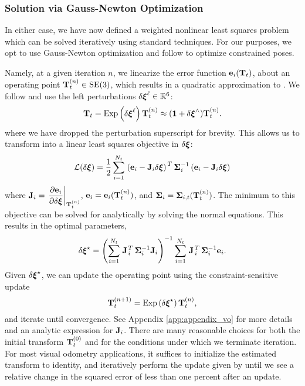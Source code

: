 \subsubsection{Solution via Gauss-Newton Optimization}
\label{sec:vo_gauss_newton}
 In either case, we have now defined a weighted nonlinear least squares problem which can be solved iteratively using
standard techniques. For our purposes, we opt to use Gauss-Newton optimization and follow \cite{Barfoot2017-ri} to optimize constrained poses.

Namely, at a given iteration $n$, we linearize the error function $\boldsymbol{\mathbf{e}}_{i}(\boldsymbol{\mathbf{T}}_t)$, about an operating point $\boldsymbol{\mathbf{T}}_t^{(n)} \in \mathrm{SE}(3)$, which results in a quadratic approximation to . We follow  and use the left perturbations $\delta\Vector{\xi}^\ell \in\RealNumbers[6]$:
\begin{equation}
  \boldsymbol{\mathbf{T}}_t = \mathrm{Exp}\left({\delta\boldsymbol{\mathbf{\xi}}^\ell}\right) \boldsymbol{\mathbf{T}}_t^{(n)} \approx (\boldsymbol{\mathbf{1}} + \delta\boldsymbol{\mathbf{\xi}}^{\wedge}) \boldsymbol{\mathbf{T}}_t^{(n)}.
\end{equation}
where we have dropped the perturbation superscript for brevity. This allows us to transform  into a linear least squares objective in $\delta\boldsymbol{\mathbf{\xi}}$:
\begin{equation}
\label{eq:vo_linleastsquares}
  \mathcal{L}(\delta \boldsymbol{\mathbf{\xi}}) = \frac{1}{2}\sum_{i=1}^{N_t} 
  \left.{\left(\boldsymbol{\mathbf{e}}_{i}
  - \boldsymbol{\mathbf{J}}_{i} \delta\boldsymbol{\mathbf{\xi}}\right)}\right.^T
\boldsymbol{\mathbf{\Sigma}}_{i}^{-1}
 \left(\boldsymbol{\mathbf{e}}_{i}
 - \boldsymbol{\mathbf{J}}_{i} \delta\boldsymbol{\mathbf{\xi}}\right)
  \end{equation}
where $\boldsymbol{\mathbf{J}}_{i} = \left.\dfrac{\partial \boldsymbol{\mathbf{e}}_i}{\partial \delta \boldsymbol{\mathbf{\xi}}}\right|_{\boldsymbol{\mathbf{T}}_t^{(n)}}$, $\boldsymbol{\mathbf{e}}_{i} = \boldsymbol{\mathbf{e}}_{i}(\boldsymbol{\mathbf{T}}_t^{(n)})$, and $\boldsymbol{\mathbf{\Sigma}}_{i} =  \boldsymbol{\mathbf{\Sigma}}_{i,t}(\boldsymbol{\mathbf{T}}_t^{(n)})$. 
The minimum to this objective can be solved for analytically by solving the normal equations. This results in the optimal parameters,  
\begin{equation}
  \delta\boldsymbol{\mathbf{\xi}}^{\star} = 
  \left( \sum_{i=1}^{N_t} \left.{\boldsymbol{\mathbf{J}}}\right.^T_{i}
  \boldsymbol{\mathbf{\Sigma}}_{i}^{-1} \boldsymbol{\mathbf{J}}_{i} \right)^{-1}
  \sum_{i=1}^{N_t} \left.{\boldsymbol{\mathbf{J}}}\right.^T_{i}
  \boldsymbol{\mathbf{\Sigma}}_{i}^{-1} \boldsymbol{\mathbf{e}}_{i}. 
\label{eq:least-squares-iteration}
\end{equation}
Given $\delta\boldsymbol{\mathbf{\xi}}^{\star}$, we can update the operating point using the constraint-sensitive update
\begin{equation}
  \boldsymbol{\mathbf{T}}_t^{(n+1)} = \mathrm{Exp}\left({\delta\boldsymbol{\mathbf{\xi}}^{\star}}\right) \boldsymbol{\mathbf{T}}_t^{(n)}, \label{eq:vo_se3_update}
\end{equation}
and iterate until convergence. See Appendix \ref{app:appendix_vo}
for more details and an analytic expression for $\boldsymbol{\mathbf{J}}_{i}$. 
There are many reasonable choices for both the initial transform
$\boldsymbol{\mathbf{T}}_t^{(0)}$ and for the conditions under which we terminate
iteration. For most visual odometry applications, it suffices to initialize the estimated transform to identity, and iteratively
perform the update given by  until we see a relative change in
the squared error of less than one percent after an update. 

